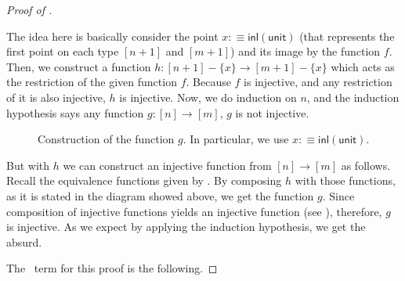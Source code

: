 \documentclass[11pt, a4paper, oneside]{amsart}
\begin{document}
\begin{proof}[Proof of ]\label{proof-pigeon-theorem}

\begin{code}[hide]%
%
\>[2]\AgdaSpace{}%
\AgdaSpace{}%
\AgdaSymbol{\{}\AgdaSymbol{\}}\<%
\end{code}

The idea here is basically consider the point $x :\equiv \mathsf{inl}
(\mathsf{unit})$ (that represents the first point on each type $[n+1]$ and
$[m+1]$) and its image by the function $f$. Then, we construct a function $h :
[n + 1] - \{x\} \to [ m + 1 ] - \{ x\}$ which acts as the restriction of the
given function $f$. Because $f$ is injective, and any restriction of it is
also injective, $h$ is injective. Now, we do induction on $n$, and the
induction hypothesis says any function $g : [n] → [m]$, $g$ is not injective.

\begin{figure}[!ht]
\begin{center}
\end{center}
\caption{Construction of the function $g$. In particular, we use $x :\equiv \mathsf{inl}(\mathsf{unit})$. }
\label{diagram}
\end{figure}

But with $h$ we can construct an injective function from $[n] \to [m]$ as
follows. Recall the equivalence functions given by . By
composing $h$ with those functions, as it is stated in the diagram showed
above, we get the function $g$. Since composition of injective functions
yields an injective function (see ),
therefore, $g$ is injective. As we expect by applying the induction
hypothesis, we get the absurd.

The \Agda\ term for this proof is the following.


\end{proof}
\end{document}
